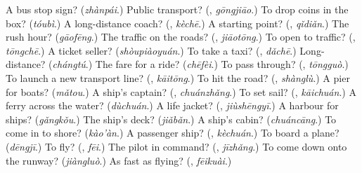 \begin{tcolorbox}[breakable,colback=teal!4,colframe=teal!35!black,title={Before you move on}]
A bus stop sign? (\emph{zhànpái}.) Public transport? (\textbf{}, \emph{gōngjiāo}.) To drop coins in the box? (\emph{tóubì}.) A long-distance coach? (\textbf{}, \emph{kèchē}.) A starting point? (\textbf{}, \emph{qǐdiǎn}.) The rush hour? (\emph{gāofēng}.) The traffic on the roads? (\textbf{}, \emph{jiāotōng}.) To open to traffic? (\textbf{}, \emph{tōngchē}.) A ticket seller? (\emph{shòupiàoyuán}.) To take a taxi? (\textbf{}, \emph{dǎchē}.) Long-distance? (\emph{chángtú}.) The fare for a ride? (\emph{chēfèi}.) To pass through? (\textbf{}, \emph{tōngguò}.) To launch a new transport line? (\textbf{}, \emph{kāitōng}.) To hit the road? (\textbf{}, \emph{shànglù}.) A pier for boats? (\emph{mǎtou}.) A ship's captain? (\textbf{}, \emph{chuánzhǎng}.) To set sail? (\textbf{}, \emph{kāichuán}.) A ferry across the water? (\emph{dùchuán}.) A life jacket? (\textbf{}, \emph{jiùshēngyī}.) A harbour for ships? (\emph{gǎngkǒu}.) The ship's deck? (\emph{jiǎbǎn}.) A ship's cabin? (\emph{chuáncāng}.) To come in to shore? (\emph{kào'àn}.) A passenger ship? (\textbf{}, \emph{kèchuán}.) To board a plane? (\emph{dēngjī}.) To fly? (\textbf{}, \emph{fēi}.) The pilot in command? (\textbf{}, \emph{jīzhǎng}.) To come down onto the runway? (\emph{jiàngluò}.) As fast as flying? (\textbf{}, \emph{fēikuài}.)
\end{tcolorbox}
